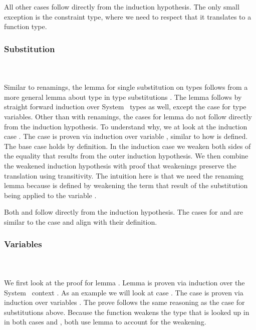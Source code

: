 \noindent All other cases follow directly from the induction hypothesis. 
The only small exception is the constraint type, where we need to respect that it translates to a function type.

\subsubsection{Substitution}\hfill\\\\
Similar to renamings, the lemma for single substitution on types  follows from a more general lemma about type in type substitutions .
The lemma  follows by straight forward induction over System \Fo\ types as well, except the case for type variables. 
Other than with renamings, the cases for lemma  do not follow directly from the induction hypothesis. 
To understand why, we at look at the induction case .
\DPTVarPresSub
The case  is proven via induction over variable , similar to how  is defined. 
The base case holds by definition. 
In the induction case we weaken both sides of the equality that results from the outer induction hypothesis. 
We then combine the weakened induction hypothesis with proof that weakenings preserve the translation using transitivity. 
The intuition here is that we need the renaming lemma  because  is defined by weakening the term that result of the substitution  being applied to the variable .

\noindent Both  and  follow directly from the induction hypothesis. 
The cases for  and  are similar to the case  and align with their definition.

\subsubsection{Variables}\hfill\\\\
We first look at the proof for lemma . 
Lemma  is proven via induction over the System \Fo\ context . 
\DPTVarPresLookup
As an example we will look at case   . The case is proven via induction over variables . 
The prove follows the same reasoning as the  case for substitutions above. 
Because the function  weakens the type  that is looked up in  in both cases  and , both use lemma  to account for the weakening. 



